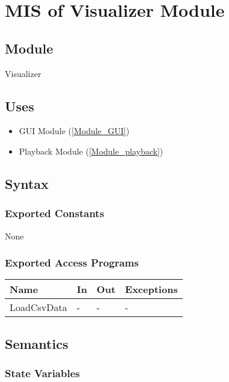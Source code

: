 \documentclass[12pt, titlepage]{article}
\begin{document}
\newpage

\section{MIS of Visualizer Module} \label{Module_visualizer} 

\subsection{Module}

Visualizer

\subsection{Uses}

\begin{itemize}
  \item GUI Module (\ref{Module_GUI})
  \item Playback Module (\ref{Module_playback})
\end{itemize}

\subsection{Syntax}

\subsubsection{Exported Constants}
None

\subsubsection{Exported Access Programs}

\begin{center}
\begin{tabular}{p{2cm} p{4cm} p{4cm} p{2cm}}
\hline
\textbf{Name} & \textbf{In} & \textbf{Out} & \textbf{Exceptions} \\
\hline
LoadCsvData & - & - & - \\
\hline
\end{tabular}
\end{center}

\subsection{Semantics}

\subsubsection{State Variables}
\end{document}
